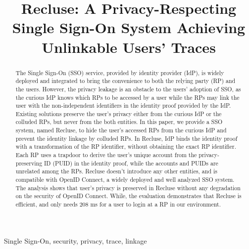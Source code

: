 \documentclass[conference, 10pt]{IEEEtran}
\begin{document}
\title{{Recluse}: A Privacy-Respecting Single Sign-On System Achieving Unlinkable Users' Traces}
%
\maketitle
\begin{abstract}
 The Single Sign-On (SSO) service, provided by identity provider (IdP),  is widely deployed and integrated to bring the convenience to both the relying party (RP) and the users.
 However, the privacy leakage is an obstacle to the users' adoption of SSO, as the curious IdP knows which RPs to be accessed by a user  
 while the RPs may link the user with the non-independent identifiers in the identity proof provided by the IdP.
 Existing solutions preserve the user's privacy either from the curious IdP or the colluded RPs, but never from the both entities. 
In this paper, we provide a SSO system, named Recluse, to hide the user's accessed RPs from the curious IdP 
and prevent the identity linkage by colluded RPs. 
In Recluse, IdP binds the identity proof with a transformation of the RP identifier, without obtaining the exact RP identifier.
Each RP uses a trapdoor to derive the user's unique account from the  privacy-preserving ID (PUID) in the identity proof, 
while the accounts and PUIDs are unrelated among the RPs.
Recluse doesn't introduce any other entities, and  is compatible with OpenID Connect, a widely deployed and well analyzed SSO system. 
The analysis shows that user's privacy is preserved in Recluse without any degradation on the security of OpenID Connect.
While, the evaluation demonstrates that Recluse is efficient, and only needs 208 ms for a user to login at a RP in our environment.
\end{abstract}
\begin{IEEEkeywords}
Single Sign-On, security, privacy, trace, linkage
\end{IEEEkeywords}















\end{document}

